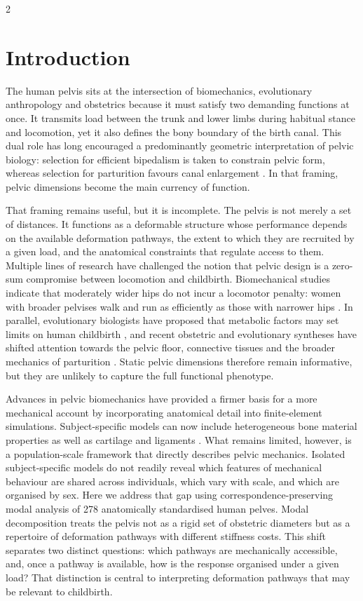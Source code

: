 \documentclass[openacc]{rsproca_new}
\begin{document}
\begin{multicols}{2}

\section{Introduction}

The human pelvis sits at the intersection of biomechanics, evolutionary anthropology and obstetrics because it must satisfy two demanding functions at once. It transmits load between the trunk and lower limbs during habitual stance and locomotion, yet it also defines the bony boundary of the birth canal. This dual role has long encouraged a predominantly geometric interpretation of pelvic biology: selection for efficient bipedalism is taken to constrain pelvic form, whereas selection for parturition favours canal enlargement \cite{RosenbergTrevathan2002,Trevathan2015,Grunstra2023}. In that framing, pelvic dimensions become the main currency of function.

That framing remains useful, but it is incomplete. The pelvis is not merely a set of distances. It functions as a deformable structure whose performance depends on the available deformation pathways, the extent to which they are recruited by a given load, and the anatomical constraints that regulate access to them. Multiple lines of research have challenged the notion that pelvic design is a zero-sum compromise between locomotion and childbirth. Biomechanical studies indicate that moderately wider hips do not incur a locomotor penalty: women with broader pelvises walk and run as efficiently as those with narrower hips \cite{Warrener2015}. In parallel, evolutionary biologists have proposed that metabolic factors may set limits on human childbirth \cite{Dunsworth2012}, and recent obstetric and evolutionary syntheses have shifted attention towards the pelvic floor, connective tissues and the broader mechanics of parturition \cite{Pavlicev2020,Haeusler2021,Grunstra2023}. Static pelvic dimensions therefore remain informative, but they are unlikely to capture the full functional phenotype.

Advances in pelvic biomechanics have provided a firmer basis for a more mechanical account by incorporating anatomical detail into finite-element simulations. Subject-specific models can now include heterogeneous bone material properties as well as cartilage and ligaments \cite{Eichenseer2011,Hammer2013}. What remains limited, however, is a population-scale framework that directly describes pelvic mechanics. Isolated subject-specific models do not readily reveal which features of mechanical behaviour are shared across individuals, which vary with scale, and which are organised by sex. Here we address that gap using correspondence-preserving modal analysis of 278 anatomically standardised human pelves. Modal decomposition treats the pelvis not as a rigid set of obstetric diameters but as a repertoire of deformation pathways with different stiffness costs. This shift separates two distinct questions: which pathways are mechanically accessible, and, once a pathway is available, how is the response organised under a given load? That distinction is central to interpreting deformation pathways that may be relevant to childbirth.


\end{multicols}
\end{document}
